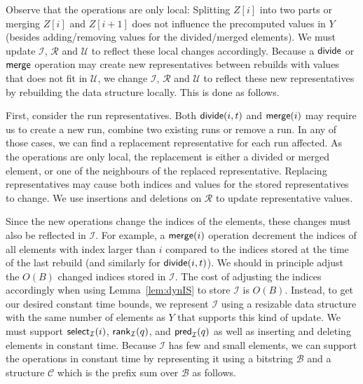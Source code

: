 Observe that the operations are only local: Splitting $Z[i]$ into two parts or merging $Z[i]$ and $Z[i+1]$ does not influence the precomputed values in $Y$ (besides adding/removing values for the divided/merged elements). We must update $\mathcal{I}$, $\mathcal{R}$ and $\mathcal{U}$ to reflect these local changes accordingly. Because a $\mathsf{divide}$ or $\mathsf{merge}$ operation may create new representatives between rebuilds with values that does not fit in $\mathcal{U}$, we change $\mathcal{I}$, $\mathcal{R}$ and $\mathcal{U}$ to reflect these new representatives by rebuilding the data structure locally. This is done as follows.

First, consider the run representatives. Both $\mathsf{divide}(i, t)$ and $\mathsf{merge}(i)$ may require us to create a new run, combine two existing runs or remove a run.
In any of those cases, we can find a replacement representative for each run affected. 
As the operations are only local, the replacement is either a divided or merged element, or one of the neighbours of the replaced representative. 
Replacing representatives may cause both indices and values for the stored representatives to change.
We use insertions and deletions on $\mathcal{R}$ to update representative values. 

Since the new operations change the indices of the elements, these changes must also be reflected in $\mathcal{I}$. For example, a $\mathsf{merge}(i)$ operation decrement the indices of all elements with index larger than $i$ compared to the indices stored at the time of the last rebuild (and similarly for $\mathsf{divide}(i, t)$). We should in principle adjust the $O(B)$ changed indices stored in $\mathcal{I}$. The cost of adjusting the indices accordingly when using Lemma~\ref{lem:dynIS} to store $\mathcal{I}$ is $O(B)$. 
Instead, to get our desired constant time bounds, we represent $\mathcal{I}$ using a resizable data structure with the same number of elements as $Y$ that supports this kind of update. We must support $\mathsf{select}_\mathcal{I}(i)$, $\mathsf{rank}_\mathcal{I}(q)$, and $\mathsf{pred}_\mathcal{I}(q)$ as well as inserting and deleting elements in constant time. Because $\mathcal{I}$ has few and small elements, we can support the operations in constant time by representing it using a bitstring $\mathcal{B}$ and a structure $\mathcal{C}$ which is the prefix sum over $\mathcal{B}$ as follows.


